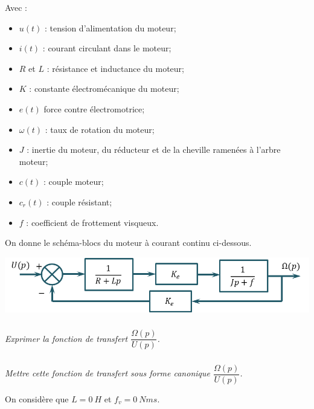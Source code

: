 \documentclass[10pt,fleqn]{article} %
\begin{document}
\begin{multicols}{2}
Avec :
\begin{itemize}
\item $u(t)$ : tension d'alimentation du moteur;
\item $i(t)$ : courant circulant dans le moteur;
\item $R$ et $L$ : résistance et inductance du moteur;
\item $K$ : constante électromécanique du moteur;
\item $e(t)$ force contre électromotrice;
\item $\omega(t)$ : taux de rotation du moteur;
\item $J$ : inertie du moteur, du réducteur et de la cheville ramenées à l'arbre moteur;
\item $c(t)$ : couple moteur; 
\item $c_r(t)$ : couple résistant; 
\item $f$ : coefficient de frottement visqueux.
\end{itemize}

On donne le schéma-blocs du moteur à courant continu ci-dessous.

\begin{center}
\includegraphics[width=\linewidth]{images/fig_06}
\end{center}


%
%
%
%
%

\subparagraph{}\textit{Exprimer la fonction de transfert $\dfrac{\Omega(p)}{U(p)}$.}


\subparagraph{}\textit{Mettre cette fonction de transfert sous forme canonique $\dfrac{\Omega(p)}{U(p)}$.}

\vspace{.25cm}

On considère que $L=\SI{0}{H}$ et $f_v=\SI{0}{Nms}$.


\end{multicols}
\end{document}
